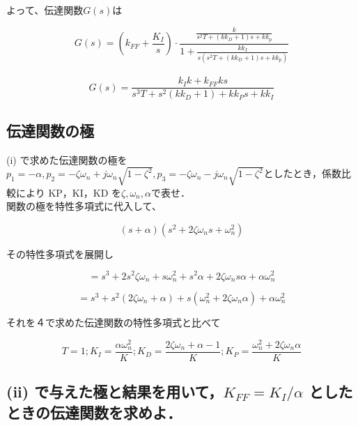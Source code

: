 \documentclass[xelatex,ja=standard,jafont=noto]{bxjsarticle}
\numberwithin{figure}{section}
\begin{document}
よって、伝達関数$ G(s) $は

\begin{equation}
    G(s)=(k_{FF}+\frac{K_{I}}{s})\cdot\frac{\frac{k}{s^{2}T+(kk_{D}+1)s+kk_{p}}}{1+\frac{kk_{I}}{s(s^{2}T+(kk_{D}+1)s+kk_{p})}}
\end{equation}\\

\begin{equation}
    G(s)=\frac{k_{I}k+k_{FF}ks}{s^{3}T+s^{2}(kk_{D}+1)+kk_{P}s+kk_{I}}
\end{equation}

\subsection{伝達関数の極}

(i) で求めた伝達関数の極を$ p_{1}=-\alpha,p_{2}=-\zeta\omega_{n}+j\omega_{n}\sqrt{1-\zeta^{2}},p_{3}=-\zeta\omega_{n}-j\omega_{n}\sqrt{1-\zeta^{2}}     $としたとき，係数比較により KP，KI，KD を$\zeta,\omega_{n},\alpha $で表せ．\\


関数の極を特性多項式に代入して、

\begin{equation}
    (s+\alpha)(s^{2}+2\zeta\omega_{n}s+\omega_{n}^{2})
\end{equation}

その特性多項式を展開し

\begin{equation}
    =s^{3}+2s^{2}\zeta\omega_{n}+s\omega_{n}^{2}+s^{2}\alpha+2\zeta\omega_{n}s\alpha+\alpha\omega_{n}^{2}
\end{equation}

\begin{equation}
    =s^{3}+s^{2}(2\zeta\omega_{n}+\alpha)+s(\omega_{n}^{2}+2\zeta\omega_{n}\alpha)+\alpha\omega_{n}^{2}
\end{equation}


それを４で求めた伝達関数の特性多項式と比べて

\begin{equation}
    T=1;K_{I}=\frac{\alpha\omega_{n}^{2}}{K};K_{D}=\frac{2\zeta\omega_{n}+\alpha-1}{K};K_{P}=\frac{\omega_{n}^{2}+2\zeta\omega_{n}\alpha}{K}
\end{equation}



\subsection{(ii) で与えた極と結果を用いて，$K_{FF}=K_{I}/\alpha$ としたときの伝達関数を求めよ．}
\end{document}
